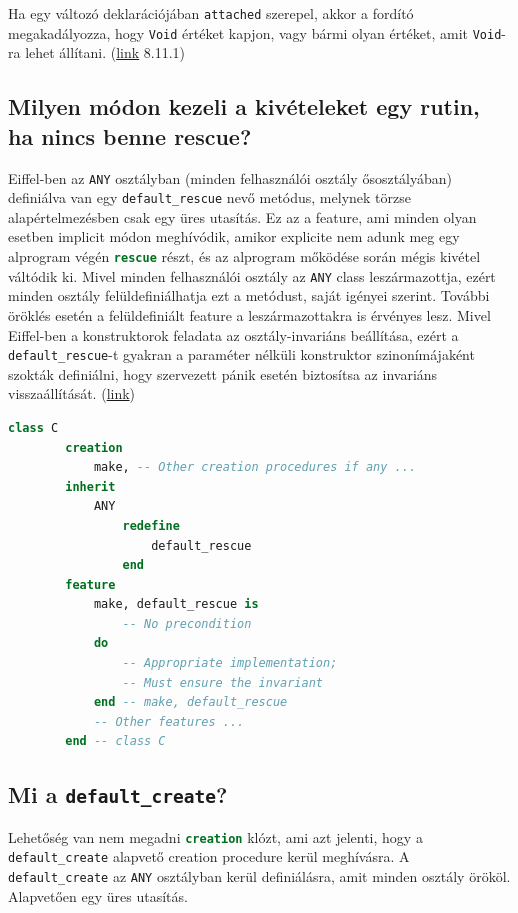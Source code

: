 	Ha egy változó deklarációjában \lstinline[language=Eiffel]|attached| szerepel, akkor a fordító megakadályozza, hogy \lstinline[language=Eiffel]|Void| értéket kapjon, vagy bármi olyan értéket, amit \lstinline[language=Eiffel]|Void|-ra lehet állítani. (\href{http://www.ecma-international.org/publications/files/ECMA-ST/ECMA-367.pdf}{link} 8.11.1)

\subsection{ Milyen módon kezeli a kivételeket egy rutin, ha nincs benne rescue? }
	Eiffel-ben az \lstinline[language=Eiffel]|ANY| osztályban (minden felhasználói osztály ősosztályában) definiálva van egy \lstinline[language=Eiffel]|default_rescue| nevő metódus, melynek törzse alapértelmezésben csak egy üres utasítás. Ez az a feature, ami minden olyan esetben implicit módon meghívódik, amikor explicite nem adunk meg egy alprogram végén \lstinline[language=Eiffel]|rescue| részt, és az alprogram mőködése során mégis kivétel váltódik ki. Mivel minden felhasználói osztály az \lstinline[language=Eiffel]|ANY| class leszármazottja, ezért minden osztály felüldefiniálhatja ezt a metódust, saját igényei szerint. További öröklés esetén a felüldefiniált feature a leszármazottakra is érvényes lesz. Mivel Eiffel-ben a konstruktorok feladata az osztály-invariáns beállítása, ezért a \lstinline[language=Eiffel]|default_rescue|-t gyakran a paraméter nélküli konstruktor szinonímájaként szokták definiálni, hogy szervezett pánik esetén biztosítsa az invariáns visszaállítását. (\href{http://nyelvek.inf.elte.hu/leirasok/Eiffel/index.php?chapter=7}{link})

	\begin{lstlisting}[language=Eiffel]
		class C
		creation
			make, -- Other creation procedures if any ...
		inherit
			ANY
				redefine
					default_rescue
				end	
		feature
			make, default_rescue is
				-- No precondition
			do
				-- Appropriate implementation;
				-- Must ensure the invariant
			end -- make, default_rescue
			-- Other features ...
		end -- class C
	\end{lstlisting}

\subsection{ Mi a \lstinline[language=Eiffel]|default_create|? }
	Lehetőség van nem megadni \lstinline[language=Eiffel]|creation| klózt, ami azt jelenti, hogy a \lstinline[language=Eiffel]|default_create| alapvető creation procedure kerül meghívásra. A \lstinline[language=Eiffel]|default_create| az \lstinline[language=Eiffel]|ANY| osztályban kerül definiálásra, amit minden osztály örököl. Alapvetően egy üres utasítás.

